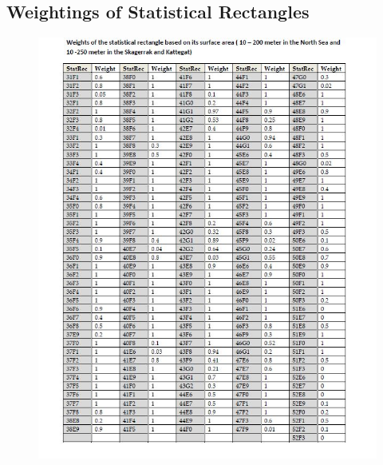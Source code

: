 \documentclass[a4paper 12pt]{article}
\numberwithin{equation}{section}
\begin{document}
\begin{appendices}
 \section{Weightings of Statistical Rectangles}
 \label{secAp:weightings}
\begin{figure}[h!]
  \centering
 {\includegraphics[width=15.5cm]{recWeightings.jpg}}   
 \captionsetup{font= footnotesize, width=15cm}{
 \caption{}\label{weightings11}}
\end{figure}
 
\end{appendices}


\clearpage



\end{document}
